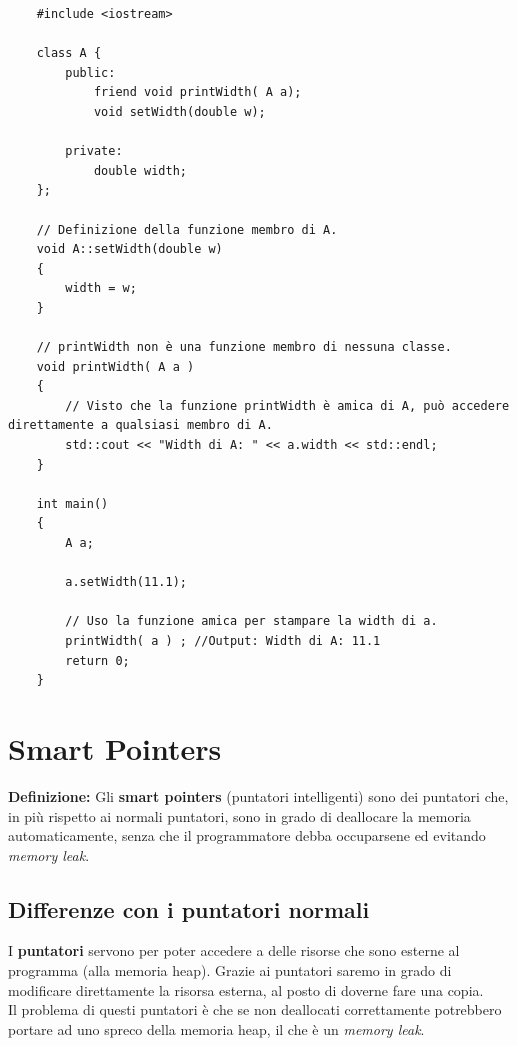 \begin{lstlisting}
	#include <iostream>
	
	class A {
		public:
			friend void printWidth( A a);
			void setWidth(double w);
			
		private:
			double width;
	};

	// Definizione della funzione membro di A.
	void A::setWidth(double w)
	{
		width = w;
	}

	// printWidth non è una funzione membro di nessuna classe.
	void printWidth( A a )
	{
		// Visto che la funzione printWidth è amica di A, può accedere direttamente a qualsiasi membro di A.
		std::cout << "Width di A: " << a.width << std::endl;
	}

	int main()
	{
		A a;
		
		a.setWidth(11.1);
		
		// Uso la funzione amica per stampare la width di a.
		printWidth( a ) ; //Output: Width di A: 11.1
		return 0;
	}
\end{lstlisting}


\newpage

\section{Smart Pointers}

\textsf{\small \textbf{Definizione: } Gli \textbf{smart pointers} (puntatori intelligenti) sono dei puntatori che, in più rispetto ai normali puntatori, sono in grado di deallocare la memoria automaticamente, senza che il programmatore debba occuparsene ed evitando \emph{memory leak}.} \\

\subsection{Differenze con i puntatori normali}

\textsf{\small I \textbf{puntatori} servono per poter accedere a delle risorse che sono esterne al programma (alla memoria heap). Grazie ai puntatori saremo in grado di modificare direttamente la risorsa esterna, al posto di doverne fare una copia.} \\

\textsf{\small Il problema di questi puntatori è che se non deallocati correttamente potrebbero portare ad uno spreco della memoria heap, il che è un \emph{memory leak}.} \\

